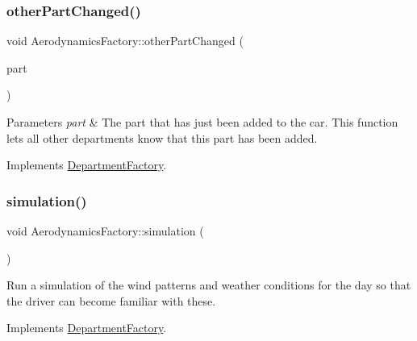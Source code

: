 \subsubsection{\texorpdfstring{other\+Part\+Changed()}{otherPartChanged()}}
{\footnotesize\ttfamily void Aerodynamics\+Factory\+::other\+Part\+Changed (\begin{DoxyParamCaption}\item[{\hyperlink{classDepartmentOutput}{Department\+Output} $\ast$}]{part }\end{DoxyParamCaption})\hspace{0.3cm}{\ttfamily [virtual]}}


\begin{DoxyParams}{Parameters}
{\em part} & The part that has just been added to the car. This function lets all other departments know that this part has been added. \\
\hline
\end{DoxyParams}


Implements \hyperlink{classDepartmentFactory_a41e5c96ee84f8237cb08d31cd782efae}{Department\+Factory}.

\mbox{\label{classAerodynamicsFactory_ab8da5b4d88a649174376d08d17503d30}} 
\subsubsection{\texorpdfstring{simulation()}{simulation()}}
{\footnotesize\ttfamily void Aerodynamics\+Factory\+::simulation (\begin{DoxyParamCaption}{ }\end{DoxyParamCaption})\hspace{0.3cm}{\ttfamily [virtual]}}

Run a simulation of the wind patterns and weather conditions for the day so that the driver can become familiar with these. 

Implements \hyperlink{classDepartmentFactory_ad7360e63135822e44031053723ff95fc}{Department\+Factory}.

\mbox{\label{classAerodynamicsFactory_a3bfc0efb95b639e586eaa0a45f91fa2b}} 

